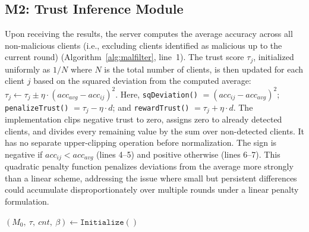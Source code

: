 \documentclass[conference]{IEEEtran}
\begin{document}
\subsection{M2: Trust Inference Module}
Upon receiving the results, the server computes the average accuracy across all non-malicious clients (i.e., excluding clients identified as malicious up to the current round) (Algorithm~\ref{alg:malfilter}, line~1). The trust score $\tau_j$, initialized uniformly as $1/N$ where $N$ is the total number of clients, is then updated for each client $j$ based on the squared deviation from the computed average:
$\tau_j \leftarrow \tau_j \pm \eta \cdot (acc_{avg} - acc_{ij})^2$.
Here, \texttt{sqDeviation()} $= (acc_{ij}-acc_{avg})^2$; \texttt{penalizeTrust()} $= \tau_j - \eta \cdot d$; and \texttt{rewardTrust()} $= \tau_j + \eta \cdot d$. The implementation clips negative trust to zero, assigns zero to already detected clients, and divides every remaining value by the sum over non-detected clients. It has no separate upper-clipping operation before normalization.
The sign is negative if $acc_{ij} < acc_{avg}$ (lines 4--5) and positive otherwise (lines 6--7). This quadratic penalty function penalizes deviations from the average more strongly than a linear scheme, addressing the issue where small but persistent differences could accumulate disproportionately over multiple rounds under a linear penalty formulation.


\IncMargin{1em}
\setlength{\textfloatsep}{0pt}
\begin{algorithm}[t]
  \caption{\texttt{AntiFLipper()}}\label{alg:antiflipper}
  \Indm 
  \Indp
  \BlankLine

  $(M_0,\ \tau,\ cnt,\ \beta) \leftarrow \texttt{Initialize}()$\\


\end{algorithm}
\DecMargin{1em}
\end{document}
